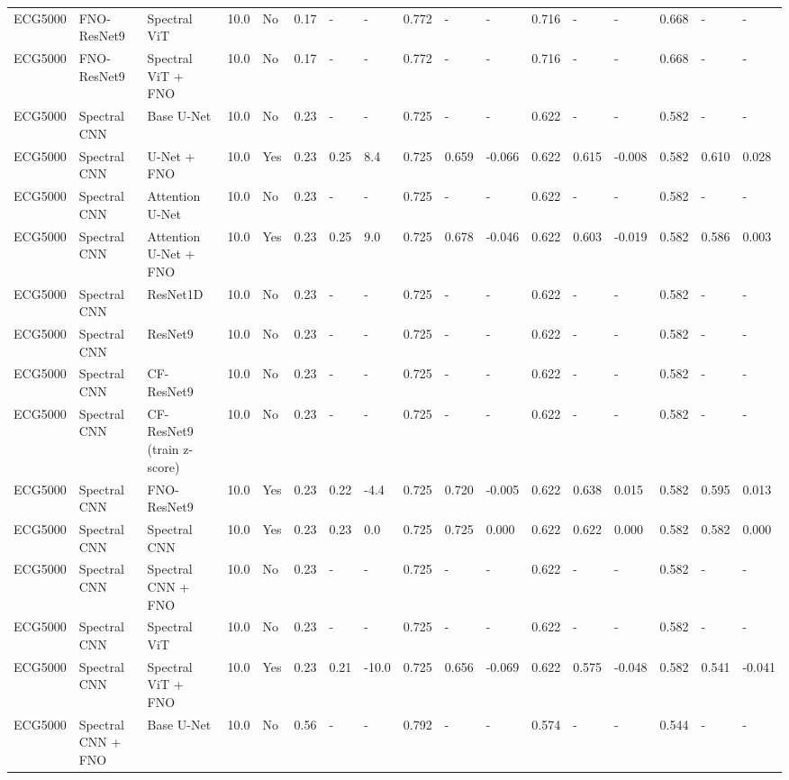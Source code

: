 \begin{longtable}{lllllllllllllllll}
ECG5000 & FNO-ResNet9 & Spectral ViT & 10.0 & No & 0.17 & - & - & 0.772 & - & - & 0.716 & - & - & 0.668 & - & - \\
ECG5000 & FNO-ResNet9 & Spectral ViT + FNO & 10.0 & No & 0.17 & - & - & 0.772 & - & - & 0.716 & - & - & 0.668 & - & - \\
ECG5000 & Spectral CNN & Base U-Net & 10.0 & No & 0.23 & - & - & 0.725 & - & - & 0.622 & - & - & 0.582 & - & - \\
ECG5000 & Spectral CNN & U-Net + FNO & 10.0 & Yes & 0.23 & 0.25 & 8.4 & 0.725 & 0.659 & -0.066 & 0.622 & 0.615 & -0.008 & 0.582 & 0.610 & 0.028 \\
ECG5000 & Spectral CNN & Attention U-Net & 10.0 & No & 0.23 & - & - & 0.725 & - & - & 0.622 & - & - & 0.582 & - & - \\
ECG5000 & Spectral CNN & Attention U-Net + FNO & 10.0 & Yes & 0.23 & 0.25 & 9.0 & 0.725 & 0.678 & -0.046 & 0.622 & 0.603 & -0.019 & 0.582 & 0.586 & 0.003 \\
ECG5000 & Spectral CNN & ResNet1D & 10.0 & No & 0.23 & - & - & 0.725 & - & - & 0.622 & - & - & 0.582 & - & - \\
ECG5000 & Spectral CNN & ResNet9 & 10.0 & No & 0.23 & - & - & 0.725 & - & - & 0.622 & - & - & 0.582 & - & - \\
ECG5000 & Spectral CNN & CF-ResNet9 & 10.0 & No & 0.23 & - & - & 0.725 & - & - & 0.622 & - & - & 0.582 & - & - \\
ECG5000 & Spectral CNN & CF-ResNet9 (train z-score) & 10.0 & No & 0.23 & - & - & 0.725 & - & - & 0.622 & - & - & 0.582 & - & - \\
ECG5000 & Spectral CNN & FNO-ResNet9 & 10.0 & Yes & 0.23 & 0.22 & -4.4 & 0.725 & 0.720 & -0.005 & 0.622 & 0.638 & 0.015 & 0.582 & 0.595 & 0.013 \\
ECG5000 & Spectral CNN & Spectral CNN & 10.0 & Yes & 0.23 & 0.23 & 0.0 & 0.725 & 0.725 & 0.000 & 0.622 & 0.622 & 0.000 & 0.582 & 0.582 & 0.000 \\
ECG5000 & Spectral CNN & Spectral CNN + FNO & 10.0 & No & 0.23 & - & - & 0.725 & - & - & 0.622 & - & - & 0.582 & - & - \\
ECG5000 & Spectral CNN & Spectral ViT & 10.0 & No & 0.23 & - & - & 0.725 & - & - & 0.622 & - & - & 0.582 & - & - \\
ECG5000 & Spectral CNN & Spectral ViT + FNO & 10.0 & Yes & 0.23 & 0.21 & -10.0 & 0.725 & 0.656 & -0.069 & 0.622 & 0.575 & -0.048 & 0.582 & 0.541 & -0.041 \\
ECG5000 & Spectral CNN + FNO & Base U-Net & 10.0 & No & 0.56 & - & - & 0.792 & - & - & 0.574 & - & - & 0.544 & - & - \\

\end{longtable}
